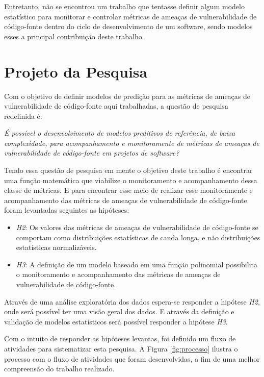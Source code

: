 Entretanto, não se encontrou um trabalho que tentasse definir algum modelo
estatístico para monitorar e controlar métricas de ameaças de vulnerabilidade de
código-fonte dentro do ciclo de desenvolvimento de um software, sendo modelos
esses a principal contribuição deste trabalho.




\section{Projeto da Pesquisa}\label{metodologia:planejamentopesquisa}

Com o objetivo de definir modelos de predição para as métricas de ameaças de
vulnerabilidade de código-fonte aqui trabalhadas, a questão de pesquisa
redefinida é:

\begin{center}
  \textit{É possível o desenvolvimento de modelos preditivos de referência, de
  baixa complexidade, para acompanhamento e monitoramente de métricas de ameaças
de vulnerabilidade de código-fonte em projetos de software?}
\end{center}

Tendo essa questão de pesquisa em mente o objetivo deste trabalho é encontrar
uma função matemática que viabilize o monitoramento e acompanhamento dessa classe de
métricas. E para encontrar esse meio de realizar esse monitoramente e
acompanhamento das métricas de ameaças de vulnerabilidade de código-fonte foram
levantadas seguintes as hipóteses:

\begin{itemize}\label{hipoteses2}
  \item \textit{H2}: Os valores das métricas de ameaças de vulnerabilidade de
    código-fonte se comportam como distribuições estatísticas de cauda longa, e
    não distribuições estatísticas normalizáveis.

  \item \textit{H3}: A definição de um modelo baseado em uma função polinomial
   possibilita o monitoramento e acompanhamento das métricas de ameaças
   de vulnerabilidade de código-fonte.
\end{itemize}

Através de uma análise exploratória dos dados espera-se responder a hipótese
\textit{H2}, onde será possível ter uma visão geral dos dados. E através da
definição e validação de modelos estatísticos será possível responder a hipótese
\textit{H3}.

Com o intuito de responder as hipóteses levantas, foi definido um fluxo de
atividades para sistematizar esta pesquisa. A Figura \ref{fig:processo}
ilustra o processo com o fluxo de atividades que foram
desenvolvidas, a fim de uma melhor compreensão do trabalho realizado.

